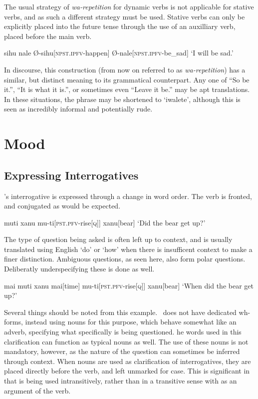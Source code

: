 The usual strategy of \textit{wa-repetition} for dynamic verbs is not applicable for stative verbs, and as such a different strategy must be used.
Stative verbs can only be explicitly placed into the future tense through the use of an auxilliary verb,  placed before the main verb.

\ex
\begingl
\glpreamble sihu nale
\endpreamble
Ø-sihu[\textsc{npst.ipfv-}happen]
Ø-nale[\textsc{npst.ipfv-}be\_sad]
\glft `I will be sad.'
\endgl
\xe

In discourse, this construction (from now on referred to as \textit{wa-repetition}) has a similar, but distinct meaning to its grammatical counterpart.
Any one of ``So be it.'', ``It is what it is.'', or sometimes even ``Leave it be.'' may be apt translations.
In these situations, the phrase may be shortened to `iwalete', although this is seen as incredibly informal and potentially rude.

\section{Mood}
\subsection{Expressing Interrogatives}

\langname 's interrogative is expressed through a change in word order.
The verb is fronted, and conjugated as would be expected.

\ex
\begingl
\glpreamble muti xanu
\endpreamble
mu-ti[\textsc{pst.pfv-}rise\textsc{[q]}]
xanu[bear]
\glft `Did the bear get up?'
\endgl
\xe

The type of question being asked is often left up to context, and is usually translated using English `do' or `how' when there is insufficent context to make a finer distinction.
Ambiguous questions, as seen here, also form polar questions.
Deliberatly underspecifying these is done as well.

\ex
\begingl
\glpreamble mai muti xanu
\endpreamble
mai[time]
mu-ti[\textsc{pst.pfv-}rise\textsc{[q]}]
xanu[bear]
\glft `When did the bear get up?'
\endgl
\xe

Several things should be noted from this example.
\langname\ does not have dedicated wh-forms, instead using nouns for this purpose, which behave somewhat like an adverb, specifying what specifically is being questioned.
he words used in this clarification can function as typical nouns as well.
The use of these nouns is not mandatory, however, as the nature of the question can sometimes be inferred through context.
When nouns are used as clarification of interrogatives, they are placed directly before the verb, and left unmarked for case.
This is significant in that  is being used intransitively, rather than in a transitive sense with  as an argument of the verb.

